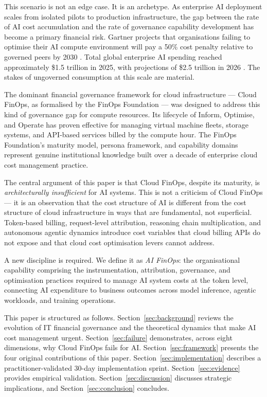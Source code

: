 \documentclass[11pt,twocolumn]{article}
\begin{document}
This scenario is not an edge case. It is an archetype. As enterprise AI deployment
scales from isolated pilots to production infrastructure, the gap between the rate
of AI cost accumulation and the rate of governance capability development has
become a primary financial risk. Gartner projects that organisations failing to
optimise their AI compute environment will pay a 50\% cost penalty relative to
governed peers by 2030 \citep{gartner2025forecast}. Total global enterprise AI
spending reached approximately \$1.5 trillion in 2025, with projections of \$2.5
trillion in 2026 \citep{gartner2025spending}. The stakes of ungoverned consumption
at this scale are material.

The dominant financial governance framework for cloud infrastructure --- Cloud
FinOps, as formalised by the FinOps Foundation \citep{finopsfoundation2023} ---
was designed to address this kind of governance gap for compute resources. Its
lifecycle of Inform, Optimise, and Operate has proven effective for managing
virtual machine fleets, storage systems, and API-based services billed by the
compute hour. The FinOps Foundation's maturity model, persona framework, and
capability domains represent genuine institutional knowledge built over a decade
of enterprise cloud cost management practice.

The central argument of this paper is that Cloud FinOps, despite its maturity,
is \textit{architecturally insufficient} for AI systems. This is not a criticism
of Cloud FinOps --- it is an observation that the cost structure of AI is
different from the cost structure of cloud infrastructure in ways that are
fundamental, not superficial. Token-based billing, request-level attribution,
reasoning chain multiplication, and autonomous agentic dynamics introduce
cost variables that cloud billing APIs do not expose and that cloud cost
optimisation levers cannot address.

A new discipline is required. We define it as \textit{AI FinOps}: the
organisational capability comprising the instrumentation, attribution, governance,
and optimisation practices required to manage AI system costs at the token level,
connecting AI expenditure to business outcomes across model inference, agentic
workloads, and training operations.

This paper is structured as follows. Section~\ref{sec:background} reviews the
evolution of IT financial governance and the theoretical dynamics that make AI
cost management urgent. Section~\ref{sec:failure} demonstrates, across eight
dimensions, why Cloud FinOps fails for AI. Section~\ref{sec:framework} presents
the four original contributions of this paper. Section~\ref{sec:implementation}
describes a practitioner-validated 30-day implementation sprint. Section~\ref{sec:evidence}
provides empirical validation. Section~\ref{sec:discussion} discusses strategic
implications, and Section~\ref{sec:conclusion} concludes.
\end{document}
